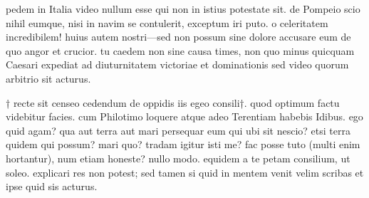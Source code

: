 


 pedem in Italia video nullum esse qui non in istius potestate sit. de Pompeio scio nihil eumque, nisi in navim se contulerit, exceptum iri puto. o celeritatem incredibilem! huius autem nostri—sed non possum sine dolore accusare eum de quo angor et crucior. tu caedem non sine causa times, non quo minus quicquam Caesari expediat ad diuturnitatem victoriae et dominationis sed video quorum arbitrio sit acturus.

 † recte sit censeo cedendum de oppidis iis egeo consili†. quod optimum factu videbitur facies. cum Philotimo loquere atque adeo Terentiam habebis Idibus. ego quid agam? qua aut terra aut mari persequar eum qui ubi sit nescio? etsi terra quidem qui possum? mari quo? tradam igitur isti me? fac posse tuto (multi enim hortantur), num etiam honeste? nullo modo. equidem a te petam consilium, ut soleo. explicari res non potest; sed tamen si quid in mentem venit velim scribas et ipse quid sis acturus.

